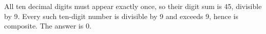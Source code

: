 All ten decimal digits must appear exactly once, so their digit sum is 45, divisible by 9. Every such ten-digit number is divisible by 9 and exceeds 9, hence is composite. The answer is $\boxed0 $.
